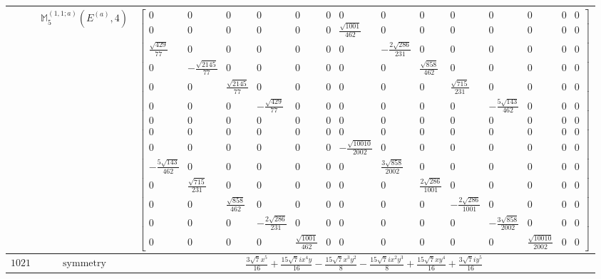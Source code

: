 \documentclass[fleqn,8pt,landscape]{jsarticle}
\begin{document}
\begin{longtable}{ccc}
$  $ & $ \mathbb{M}_{5}^{(1,1;a)}(E^{(a)},4) $ & $ \begin{bmatrix} 0 & 0 & 0 & 0 & 0 & 0 & 0 & 0 & 0 & 0 & 0 & 0 & 0 & 0 \\ 0 & 0 & 0 & 0 & 0 & 0 & \frac{\sqrt{1001}}{462} & 0 & 0 & 0 & 0 & 0 & 0 & 0 \\ \frac{\sqrt{429}}{77} & 0 & 0 & 0 & 0 & 0 & 0 & - \frac{2 \sqrt{286}}{231} & 0 & 0 & 0 & 0 & 0 & 0 \\ 0 & - \frac{\sqrt{2145}}{77} & 0 & 0 & 0 & 0 & 0 & 0 & \frac{\sqrt{858}}{462} & 0 & 0 & 0 & 0 & 0 \\ 0 & 0 & \frac{\sqrt{2145}}{77} & 0 & 0 & 0 & 0 & 0 & 0 & \frac{\sqrt{715}}{231} & 0 & 0 & 0 & 0 \\ 0 & 0 & 0 & - \frac{\sqrt{429}}{77} & 0 & 0 & 0 & 0 & 0 & 0 & - \frac{5 \sqrt{143}}{462} & 0 & 0 & 0 \\ 0 & 0 & 0 & 0 & 0 & 0 & 0 & 0 & 0 & 0 & 0 & 0 & 0 & 0 \\ 0 & 0 & 0 & 0 & 0 & 0 & 0 & 0 & 0 & 0 & 0 & 0 & 0 & 0 \\ 0 & 0 & 0 & 0 & 0 & 0 & - \frac{\sqrt{10010}}{2002} & 0 & 0 & 0 & 0 & 0 & 0 & 0 \\ - \frac{5 \sqrt{143}}{462} & 0 & 0 & 0 & 0 & 0 & 0 & \frac{3 \sqrt{858}}{2002} & 0 & 0 & 0 & 0 & 0 & 0 \\ 0 & \frac{\sqrt{715}}{231} & 0 & 0 & 0 & 0 & 0 & 0 & \frac{2 \sqrt{286}}{1001} & 0 & 0 & 0 & 0 & 0 \\ 0 & 0 & \frac{\sqrt{858}}{462} & 0 & 0 & 0 & 0 & 0 & 0 & - \frac{2 \sqrt{286}}{1001} & 0 & 0 & 0 & 0 \\ 0 & 0 & 0 & - \frac{2 \sqrt{286}}{231} & 0 & 0 & 0 & 0 & 0 & 0 & - \frac{3 \sqrt{858}}{2002} & 0 & 0 & 0 \\ 0 & 0 & 0 & 0 & \frac{\sqrt{1001}}{462} & 0 & 0 & 0 & 0 & 0 & 0 & \frac{\sqrt{10010}}{2002} & 0 & 0 \end{bmatrix} $ \\ \hline
$ 1021 $ & $ \text{symmetry} $ & $ \frac{3 \sqrt{7} x^{5}}{16} + \frac{15 \sqrt{7} i x^{4} y}{16} - \frac{15 \sqrt{7} x^{3} y^{2}}{8} - \frac{15 \sqrt{7} i x^{2} y^{3}}{8} + \frac{15 \sqrt{7} x y^{4}}{16} + \frac{3 \sqrt{7} i y^{5}}{16} $ \\

\end{longtable}
\end{document}
